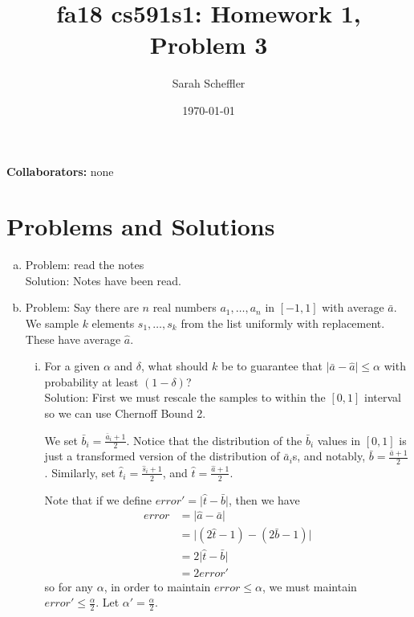 \documentclass{article}
\title{fa18 cs591s1: Homework 1, Problem 3}
\author{Sarah Scheffler}
\date{\today}
\newcommand{\trueavg}{\bar{b}}
\newcommand{\sampavg}{\hat{t}}
\begin{document}
\maketitle
\textbf{Collaborators: } none

\section{Problems and Solutions}
\begin{enumerate}[(a)]
    \item Problem: read the notes \\
        Solution: Notes have been read.
    \item Problem: Say there are $n$ real numbers $a_1, \ldots, a_n$ in $[-1,1]$ with average $\bar{a}$.  We sample $k$
        elements $s_1, \ldots, s_k$ from the list uniformly with replacement.  These have average $\hat{a}$.  
        \begin{enumerate}[(i)]
            \item For a given $\alpha$ and $\delta$, what should $k$ be to guarantee that $\vert \bar{a} - \hat{a} \vert \le \alpha$
                with probability at least $(1-\delta)$? \\
                Solution: First we must rescale the samples to within the $[0,1]$ interval so we can use Chernoff Bound 2.

                We set $\trueavg_i = \frac{\bar{a}_i + 1}{2}$.  Notice that the distribution of the $\trueavg_i$ values in
                $[0,1]$ is just a transformed version of the distribution of $\bar{a}_i$s, and notably, $\trueavg =
                \frac{\bar{a}+1}{2}$.  Similarly, set $\sampavg_i = \frac{\hat{s}_i + 1}{2}$, and $\sampavg = \frac{\hat{a}
                + 1}{2}$.

                Note that if we define $error' = \vert \sampavg - \trueavg \vert$, then we have
                \begin{align*}
                    error &= \vert \hat{a} - \bar{a} \vert \\
                        &= \vert (2\sampavg - 1) - (2\trueavg - 1) \vert \\
                        &= 2\vert \sampavg - \trueavg \vert \\
                        &= 2error'
                \end{align*}
                so for any $\alpha$, in order to maintain $error \le \alpha$, we must maintain $error' \le
                \frac{\alpha}{2}$.  Let $\alpha' = \frac{\alpha}{2}$.


\end{enumerate}
\end{enumerate}
\end{document}
